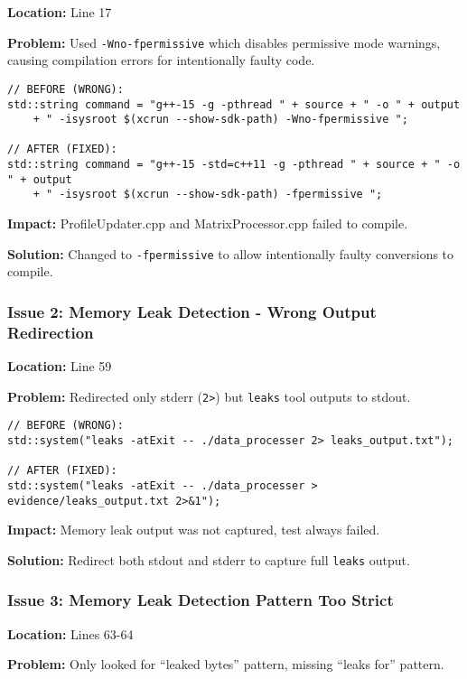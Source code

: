 \documentclass[11pt,a4paper]{article}
\begin{document}
\textbf{Location:} Line 17

\textbf{Problem:} Used \texttt{-Wno-fpermissive} which disables permissive mode warnings, causing compilation errors for intentionally faulty code.

\begin{lstlisting}[style=cpp]
// BEFORE (WRONG):
std::string command = "g++-15 -g -pthread " + source + " -o " + output
    + " -isysroot $(xcrun --show-sdk-path) -Wno-fpermissive ";

// AFTER (FIXED):
std::string command = "g++-15 -std=c++11 -g -pthread " + source + " -o " + output
    + " -isysroot $(xcrun --show-sdk-path) -fpermissive ";
\end{lstlisting}

\textbf{Impact:} ProfileUpdater.cpp and MatrixProcessor.cpp failed to compile.

\textbf{Solution:} Changed to \texttt{-fpermissive} to allow intentionally faulty conversions to compile.

\subsubsection{Issue 2: Memory Leak Detection - Wrong Output Redirection}

\textbf{Location:} Line 59

\textbf{Problem:} Redirected only stderr (\texttt{2>}) but \texttt{leaks} tool outputs to stdout.

\begin{lstlisting}[style=cpp]
// BEFORE (WRONG):
std::system("leaks -atExit -- ./data_processer 2> leaks_output.txt");

// AFTER (FIXED):
std::system("leaks -atExit -- ./data_processer > evidence/leaks_output.txt 2>&1");
\end{lstlisting}

\textbf{Impact:} Memory leak output was not captured, test always failed.

\textbf{Solution:} Redirect both stdout and stderr to capture full \texttt{leaks} output.

\subsubsection{Issue 3: Memory Leak Detection Pattern Too Strict}

\textbf{Location:} Lines 63-64

\textbf{Problem:} Only looked for ``leaked bytes'' pattern, missing ``leaks for'' pattern.
\end{document}

